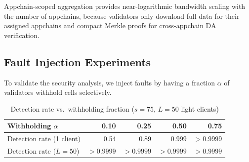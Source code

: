 Appchain-scoped aggregation provides near-logarithmic bandwidth scaling with the number of
appchains, because validators only download full data for their assigned appchains and compact
Merkle proofs for cross-appchain DA verification.

\subsection{Fault Injection Experiments}

To validate the security analysis, we inject faults by having a fraction $\alpha$ of
validators withhold cells selectively.

\begin{table}[H]
\centering
\caption{Detection rate vs.\ withholding fraction ($s = 75$, $L = 50$ light clients)}
\label{tab:fault-injection}
\begin{tabular}{lrrrr}
\toprule
\textbf{Withholding $\alpha$} & 0.10 & 0.25 & 0.50 & 0.75 \\
\midrule
Detection rate (1 client) & 0.54 & 0.89 & 0.999 & $>0.9999$ \\
Detection rate ($L=50$) & $>0.9999$ & $>0.9999$ & $>0.9999$ & $>0.9999$ \\
\bottomrule
\end{tabular}
\end{table}



